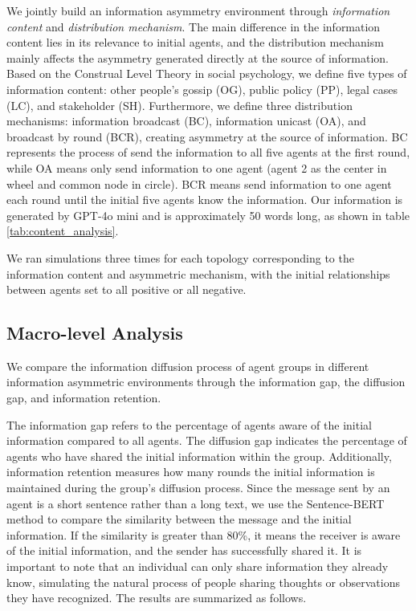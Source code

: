 We jointly build an information asymmetry environment through \textit{information content} and \textit{distribution mechanism}. 
The main difference in the information content lies in its relevance to initial agents, and the distribution mechanism mainly affects the asymmetry generated directly at the source of information.
Based on the Construal Level Theory \cite{b69} in social psychology, we define five types of information content: other people's gossip (OG), public policy (PP), legal cases (LC), and stakeholder (SH). 
Furthermore, we define three distribution mechanisms: information broadcast (BC), information unicast (OA), and broadcast by round (BCR), creating asymmetry at the source of information.
BC represents the process of send the information to all five agents at the first round, while OA means only send information to one agent (agent 2 as the center in wheel and common node in circle).
BCR means send information to one agent each round until the initial five agents know the information.
Our information is generated by GPT-4o mini and is approximately 50 words long, as shown in table \ref{tab:content_analysis}.




We ran simulations three times for each topology corresponding to the information content and asymmetric mechanism, with the initial relationships between agents set to all positive or all negative.




\subsection{Macro-level Analysis}


We compare the information diffusion process of agent groups in different information asymmetric environments through the information gap, the diffusion gap, and information retention.


The information gap refers to the percentage of agents aware of the initial information compared to all agents. The diffusion gap indicates the percentage of agents who have shared the initial information within the group. Additionally, information retention measures how many rounds the initial information is maintained during the group's diffusion process.
Since the message sent by an agent is a short sentence rather than a long text, we use the Sentence-BERT method \cite{b70} to compare the similarity between the message and the initial information. If the similarity is greater than 80\%, it means the receiver is aware of the initial information, and the sender has successfully shared it.
It is important to note that an individual can only share information they already know, simulating the natural process of people sharing thoughts or observations they have recognized. The results are summarized as follows.




